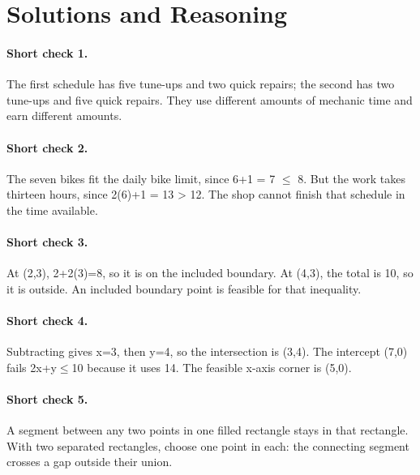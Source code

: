 \documentclass[11pt,letterpaper]{article}
\begin{document}
\clearpage
{\setlength{\parskip}{4pt}\titlespacing*{\paragraph}{0pt}{5pt}{.75em}
\section*{Solutions and Reasoning}

\paragraph{Short check 1.}
The first schedule has five tune-ups and two quick repairs; the second has two tune-ups and five quick repairs. They use different amounts of mechanic time and earn different amounts.


\paragraph{Short check 2.}
The seven bikes fit the daily bike limit, since 6+1 = 7 $\le$ 8. But the work takes thirteen hours, since 2(6)+1 = 13 \textgreater{} 12. The shop cannot finish that schedule in the time available.


\paragraph{Short check 3.}
At (2,3), 2+2(3)=8, so it is on the included boundary. At (4,3), the total is 10, so it is outside. An included boundary point is feasible for that inequality.


\paragraph{Short check 4.}
Subtracting gives x=3, then y=4, so the intersection is (3,4). The intercept (7,0) fails 2x+y$\le$10 because it uses 14. The feasible x-axis corner is (5,0).


\paragraph{Short check 5.}
A segment between any two points in one filled rectangle stays in that rectangle. With two separated rectangles, choose one point in each: the connecting segment crosses a gap outside their union.



}
\end{document}
